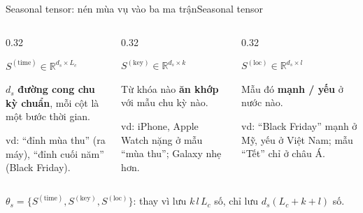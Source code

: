 \begin{frame}{Seasonal tensor: nén mùa vụ vào ba ma trận}{Seasonal tensor}
\vspace{2mm}
\begin{columns}[T,onlytextwidth]
\begin{column}{0.32\textwidth}
\begin{questioncard}
  \textbf{$S^{(\mathrm{time})}\in\mathbb R^{d_s\times L_c}$}\par
  \small $d_s$ \textbf{đường cong chu kỳ chuẩn}, mỗi cột là một bước thời gian.\par
  \vspace{1mm}
  \scriptsize\color{DTMuted} vd: ``đỉnh mùa thu'' (ra máy), ``đỉnh cuối năm'' (Black Friday).
\end{questioncard}
\end{column}
\begin{column}{0.32\textwidth}
\begin{questioncard}
  \textbf{$S^{(\mathrm{key})}\in\mathbb R^{d_s\times k}$}\par
  \small Từ khóa nào \textbf{ăn khớp} với mẫu chu kỳ nào.\par
  \vspace{2mm}
  \scriptsize\color{DTMuted} vd: iPhone, Apple Watch nặng ở mẫu ``mùa thu''; Galaxy nhẹ hơn.
\end{questioncard}
\end{column}
\begin{column}{0.32\textwidth}
\begin{questioncard}
  \textbf{$S^{(\mathrm{loc})}\in\mathbb R^{d_s\times l}$}\par
  \small Mẫu đó \textbf{mạnh / yếu} ở nước nào.\par
  \vspace{2mm}
  \scriptsize\color{DTMuted} vd: ``Black Friday'' mạnh ở Mỹ, yếu ở Việt Nam; mẫu ``Tết'' chỉ ở châu Á.
\end{questioncard}
\end{column}
\end{columns}
\vspace{2mm}
\begin{mathcard}[Definition 3]
  \small $\theta_s=\{S^{(\mathrm{time})},S^{(\mathrm{key})},S^{(\mathrm{loc})}\}$: thay vì lưu $k\,l\,L_c$ số, chỉ lưu $d_s(L_c+k+l)$ số.
\end{mathcard}
\vfill
{}
\end{frame}

